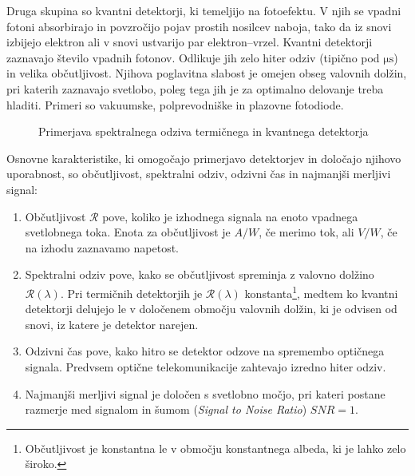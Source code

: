 Druga skupina so kvantni detektorji, ki temeljijo na fotoefektu.
V njih se vpadni fotoni absorbirajo in povzročijo pojav prostih nosilcev naboja, 
tako da iz snovi izbijejo elektron ali v snovi ustvarijo par elektron--vrzel. Kvantni 
detektorji zaznavajo število vpadnih fotonov. Odlikuje jih zelo hiter odziv 
(tipično pod $\si{\micro\second}$)
in velika občutljivost. Njihova poglavitna slabost je omejen obseg valovnih dolžin,
pri katerih zaznavajo svetlobo, poleg tega jih je za optimalno delovanje treba 
hladiti. Primeri so vakuumske, polprevodniške in plazovne fotodiode.
\begin{figure}[h]
\centering
\def\svgwidth{60truemm} 

\caption{Primerjava spektralnega odziva termičnega in kvantnega detektorja}
\label{fig:shemaTermKv}
\end{figure}

Osnovne karakteristike, ki omogočajo primerjavo detektorjev in določajo njihovo uporabnost,
so občutljivost, spektralni odziv, odzivni čas in najmanjši merljivi signal:

\begin{enumerate}
\item Občutljivost $\mathcal{R}$ pove, koliko je izhodnega signala 
na enoto vpadnega svetlobnega toka. Enota za občutljivost je $\si{A/W}$, če merimo tok, ali 
$\si{V/W}$, če na izhodu zaznavamo napetost. 
\item Spektralni odziv pove, kako se občutljivost spreminja z valovno dolžino $\mathcal{R}(\lambda)$.
Pri termičnih detektorjih je $\mathcal{R}(\lambda)$ konstanta\footnote{Občutljivost je konstantna
le v območju konstantnega albeda, ki je lahko zelo široko.}, medtem ko kvantni detektorji 
delujejo le v določenem območju valovnih dolžin, ki je odvisen od snovi, 
iz katere je detektor narejen. 
\item Odzivni čas pove, kako hitro se detektor odzove na spremembo optičnega signala. Predvsem 
optične telekomunikacije zahtevajo izredno hiter odziv.
\item Najmanjši merljivi signal je določen s svetlobno močjo, pri kateri postane razmerje med 
signalom in šumom ({\it Signal to Noise Ratio}) $SNR = 1$. 
\end{enumerate}


